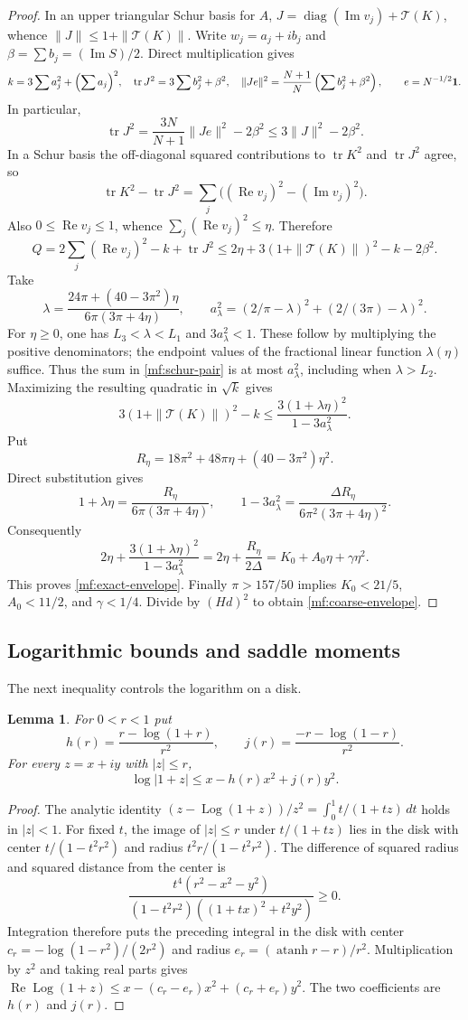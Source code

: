 \documentclass[11pt,reqno]{amsart}
\numberwithin{equation}{section}
\newtheorem{lemma}[theorem]{Lemma}
\theoremstyle{definition}
\theoremstyle{remark}
\DeclareMathOperator{\tr}{tr}
\DeclareMathOperator{\diag}{diag}
\renewcommand{\Re}{\operatorname{Re}}
\renewcommand{\Im}{\operatorname{Im}}
\DeclareMathOperator{\Log}{Log}
\begin{document}
\begin{proof}
In an upper triangular Schur basis for $A$,
$J=\diag(\Im v_j)+\mathcal T(K)$, whence
$\|J\|\le1+\|\mathcal T(K)\|$. Write $w_j=a_j+ib_j$ and
$\beta=\sum b_j=(\Im S)/2$. Direct multiplication gives
\[
 k=3\sum a_j^2+\Bigl(\sum a_j\Bigr)^2,\quad
 \tr J^2=3\sum b_j^2+\beta^2,\quad
 \|Je\|^2=\frac{N+1}{N}\left(\sum b_j^2+\beta^2\right),
 \qquad e=N^{-1/2}\mathbf1.
\]
In particular,
\[
 \tr J^2=\frac{3N}{N+1}\|Je\|^2-2\beta^2
 \le3\|J\|^2-2\beta^2.
\]
In a Schur basis the off-diagonal squared contributions to
$\tr K^2$ and $\tr J^2$ agree, so
\[
 \tr K^2-\tr J^2
 =\sum_j\bigl((\Re v_j)^2-(\Im v_j)^2\bigr).
\]
Also $0\le\Re v_j\le1$, whence $\sum_j(\Re v_j)^2\le\eta$.
Therefore
\[
 Q=2\sum_j(\Re v_j)^2-k+\tr J^2
 \le2\eta+3(1+\|\mathcal T(K)\|)^2-k-2\beta^2.
\]
Take
\[
 \lambda=\frac{24\pi+(40-3\pi^2)\eta}
                   {6\pi(3\pi+4\eta)},\qquad
 a_\lambda^2=(2/\pi-\lambda)^2+(2/(3\pi)-\lambda)^2.
\]
For $\eta\ge0$, one has $L_3<\lambda<L_1$ and
$3a_\lambda^2<1$. These follow by multiplying the positive
denominators; the endpoint values of the fractional linear
function $\lambda(\eta)$ suffice. Thus the sum in
\eqref{mf:schur-pair} is at most $a_\lambda^2$, including when
$\lambda>L_2$. Maximizing the resulting quadratic in $\sqrt k$
gives
\[
 3(1+\|\mathcal T(K)\|)^2-k
 \le\frac{3(1+\lambda\eta)^2}{1-3a_\lambda^2}.
\]
Put
\[
 R_\eta=18\pi^2+48\pi\eta+(40-3\pi^2)\eta^2.
\]
Direct substitution gives
\[
 1+\lambda\eta=\frac{R_\eta}{6\pi(3\pi+4\eta)},\qquad
 1-3a_\lambda^2
 =\frac{\Delta R_\eta}{6\pi^2(3\pi+4\eta)^2}.
\]
Consequently
\[
 2\eta+\frac{3(1+\lambda\eta)^2}{1-3a_\lambda^2}
 =2\eta+\frac{R_\eta}{2\Delta}
 =K_0+A_0\eta+\gamma\eta^2.
\]
This proves \eqref{mf:exact-envelope}. Finally $\pi>157/50$
implies $K_0<21/5$, $A_0<11/2$, and $\gamma<1/4$.
Divide by $(Hd)^2$ to obtain \eqref{mf:coarse-envelope}.
\end{proof}

\subsection{Logarithmic bounds and saddle moments}

The next inequality controls the logarithm on a disk.

\begin{lemma}\label{mf:log-metric}
For $0<r<1$ put
\[
 h(r)=\frac{r-\log(1+r)}{r^2},\qquad
 j(r)=\frac{-r-\log(1-r)}{r^2}.
\]
For every $z=x+iy$ with $|z|\le r$,
\[
 \log|1+z|\le x-h(r)x^2+j(r)y^2.
\]
\end{lemma}
\begin{proof}
The analytic identity
$(z-\Log(1+z))/z^2=\int_0^1t/(1+tz)\,dt$ holds in $|z|<1$.
For fixed $t$, the image of $|z|\le r$ under $t/(1+tz)$ lies in
the disk with center $t/(1-t^2r^2)$ and radius
$t^2r/(1-t^2r^2)$. The difference of squared radius and squared
distance from the center is
\[
 \frac{t^4(r^2-x^2-y^2)}
 {(1-t^2r^2)((1+tx)^2+t^2y^2)}\ge0.
\]
Integration therefore puts the preceding integral in the disk
with center $c_r=-\log(1-r^2)/(2r^2)$ and radius
$e_r=(\operatorname{atanh}r-r)/r^2$. Multiplication by $z^2$
and taking real parts gives
$\Re\Log(1+z)\le x-(c_r-e_r)x^2+(c_r+e_r)y^2$.
The two coefficients are $h(r)$ and $j(r)$.
\end{proof}
\end{document}
